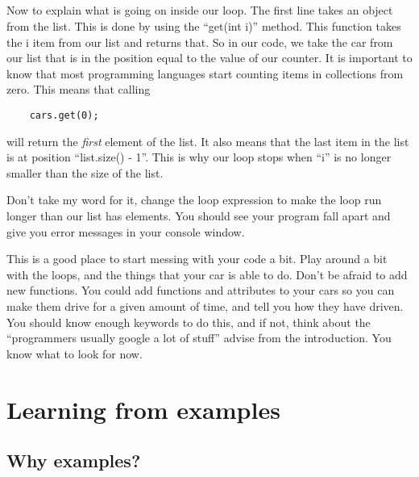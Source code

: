 \documentclass[11pt,fleqn]{book} %
\begin{document}
\paragraph{}Now to explain what is going on inside our loop. The first line takes an object from the list. This is done by using the ``get(int i)'' method. This function takes the i item from our list and returns that. So in our code, we take the car from our list that is in the position equal to the value of our counter. It is important to know that most programming languages start counting items in collections from zero. This means that calling
\begin{lstlisting}
	cars.get(0);
\end{lstlisting}
will return the \emph{first} element of the list. It also means that the last item in the list is at position ``list.size() - 1''. This is why our loop stops when ``i'' is no longer smaller than the size of the list. 
\begin{remark}
	Don't take my word for it, change the loop expression to make the loop run longer than our list has elements. You should see your program fall apart and give you error messages in your console window.
\end{remark}

\begin{exercise}
This is a good place to start messing with your code a bit. Play around a bit with the loops, and the things that your car is able to do. Don't be afraid to add new functions.
You could add functions and attributes to your cars so you can make them drive for a given amount of time, and tell you how they have driven. You should know enough keywords to do this, and if not, think about the ``programmers usually google a lot of stuff'' advise from the introduction. You know what to look for now.
\end{exercise}

\newpage
\chapter{Learning from examples}
\section{Why examples?}
\end{document}
